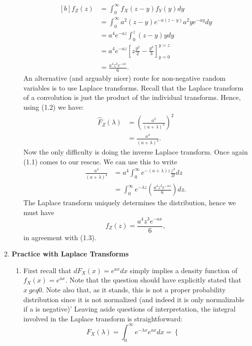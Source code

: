 \documentclass[11pt,a4paper]{article}
\begin{document}
\begin{enumerate}
\begin{enumerate}
\begin{equation}
        \begin{aligned}[b]
          f_Z(z)
          &= \int_0^\infty f_X(z - y)f_Y(y)dy\\
          &= \int_0^\infty a^2(z - y)e^{-a(z - y)}a^2ye^{-ay}dy\\
          &= a^4e^{-az}\int_0^z(z - y)ydy\\
          &= a^4e^{-az}\left[z\frac{y^2}{2} - \frac{y^3}{3}\right]_{y = 0}^{y = z}\\
          &= \frac{a^4z^3e^{-az}}{6}.
        \end{aligned}
      \end{equation}
      An alternative (and arguably nicer) route for non-negative random variables is to use Laplace transforms. Recall that the Laplace transform of a convolution is just the product of the individual transforms. Hence, using (1.2) we have:
      \begin{align*}
        \hat{F}_Z(\lambda)
        &= \left(\frac{a^2}{(a + \lambda)^2}\right)^2\\
        &= \frac{a^4}{(a + \lambda)^4}.
      \end{align*}
      Now the only difficulty is doing the inverse Laplace transform. Once again (1.1) comes to our rescue. We can use this to write
      \begin{align*}
        \frac{a^4}{(a + \lambda)^4} 
        &= a^4\int_0^\infty e^{-(a + \lambda)z}\frac{z^3}{3!}dz\\
        &= \int_0^\infty e^{-\lambda z}\left(\frac{a^4z^3e^{-az}}{6}\right)dz.
      \end{align*}
      The Laplace transform uniquely determines the distribution, hence we must have
      $$
      f_Z(z) = \frac{a^4z^3e^{-ax}}{6},
      $$
      in agreement with (1.3).
    \end{enumerate}
    \item \textbf{Practice with Laplace Transforms}
    \begin{enumerate}
      \item First recall that $dF_X(x) = e^{ax}dx$ simply implies a density function of $f_X(x) = e^{ax}$. Note that the question should have explicitly stated that $x\ geq 0$. Note also that, as it stands, this is not a proper probability distribution since it is not normalized (and indeed it is only normalizable if a is negative)' Leaving aside questions of interpretation, the integral involved in the Laplace transform is straightforward:
      $$
      \hat{F}_X(\lambda) = \int_0^\infty e^{-\lambda x}e^{ax}dx =
      \begin{cases}

\end{cases}$$
\end{enumerate}
\end{enumerate}
\end{document}
